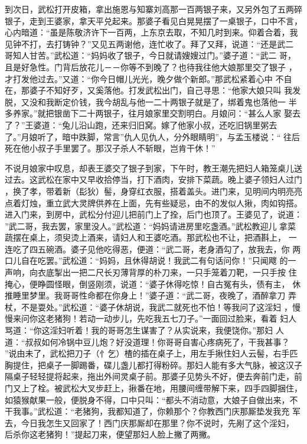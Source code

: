 到次日，武松打开皮箱，拿出施恩与知寨刘高那一百两银子来，又另外包了五两碎
银子，走到王婆家，拿天平兑起来。那婆子看见白晃晃摆了一桌银子，口中不言，
心内暗道：“虽是陈敬济许下一百两，上东京去取，不知几时到来。仰着合着，我
见钟不打，去打铸钟？”又见五两谢他，连忙收了。拜了又拜，说道：“还是武二
哥知人甘苦。”武松道：“妈妈收了银子，今日就请嫂嫂过门。”婆子道：“武二
哥，且是好急性。门背后放花儿－－你等不到晚了？也待我往他大娘那里交了银子
，才打发他过去。”又道：“你今日帽儿光光，晚夕做个新郎。”那武松紧着心中
不自在，那婆子不知好歹，又奚落他。打发武松出门，自己寻思：“他家大娘只叫
我发脱，又没和我断定价钱，我今胡乱与他一二十两银子就是了，绑着鬼也落他一
半多养家。”就把银凿下二十两银子，往月娘家里交割明白。月娘问：“甚么人家
娶去了？”王婆道：“兔儿沿山跑，还来归旧窝。嫁了他家小叔，还吃旧锅里粥去
了。”月娘听了，暗中跌脚，常言”仇人见仇人，分外眼睛明”，与孟玉楼说：“
往后死在他小叔子手里罢了。那汉子杀人不斩眼，岂肯干休！”

不说月娘家中叹息，却表王婆交了银子到家，下午时，教王潮先把妇人箱笼桌儿送
过去。这武松在家中又早收拾停当，打下酒肉，安排下菜蔬。晚上婆子领妇人过门
，换了孝，带着新（髟狄）髻，身穿红衣服，搭着盖头。进门来，见明间内明亮亮
点着灯烛，重立武大灵牌供养在上面，先有些疑忌，由不的发似人揪，肉如钩搭。
进入门来，到房中，武松分付迎儿把前门上了拴，后门也顶了。王婆见了，说道：
”武二哥，我去罢，家里没人。”武松道：“妈妈请进房里吃盏酒。”武松教迎儿
拿菜蔬摆在桌上，须臾烫上酒来，请妇人和王婆吃酒。那武松也不让，把酒斟上，
一连吃了四五碗酒。婆子见他吃得恶，便道：“武二哥，老身酒勾了，放我去，你
两口儿自在吃罢。”武松道：“妈妈，且休得胡说！我武二有句话问你！”只闻飕
的一声响，向衣底掣出一把二尺长刃薄背厚的朴刀来，一只手笼着刀靶，一只手按
住掩心，便睁圆怪眼，倒竖刚须，说道：“婆子休得吃惊！自古冤有头，债有主，
休推睡里梦里。我哥哥性命都在你身上！”婆子道：“武二哥，夜晚了，酒醉拿刀
弄杖，不是耍处。”武松道：“婆子休胡说，我武二就死也不怕！等我问了这淫妇
，慢慢来问你这老猪狗！若动一动步儿，先吃我五七刀子。”一面回过脸来，看着
妇人骂道：“你这淫妇听着！我的哥哥怎生谋害了？从实说来，我便饶你。”那妇
人道：“叔叔如何冷锅中豆儿炮？好没道理！你哥哥自害心疼病死了，干我甚事？
”说由未了，武松把刀子（忄乞）楂的插在桌子上，用左手揪住妇人云髻，右手匹
胸提住，把桌子一脚踢番，碟儿盏儿都打得粉碎。那妇人能有多大气脉，被这汉子
隔桌子轻轻提将起来，拖出外间灵桌子前。那婆子见势头不好，便去奔前门走，前
门又上了栓。被武松大叉步赶上，揪番在地，用腰间缠带解下来，四手四脚捆住，
如猿猴献果一般，便脱身不得，口中只叫：“都头不消动意，大娘子自做出来，不
干我事。”武松道：“老猪狗，我都知道了，你赖那个？你教西门庆那厮垫发我充
军去，今日我怎生又回家了！西门庆那厮却在那里？你不说时，先剐了这个淫妇，
后杀你这老猪狗！”提起刀来，便望那妇人脸上撇了两撇。

